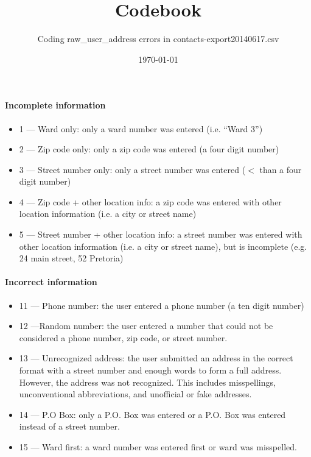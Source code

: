 \documentclass[12pt]{article}
\begin{document}

\linespread{1}

\title{Codebook}
\author{Coding raw\_user\_address errors in contacts-export20140617.csv}
\date{\today}

\maketitle

\paragraph{Incomplete information}
\begin{itemize}
\item 1 --- Ward only: only a ward number was entered (i.e. ``Ward 3'')
\item 2 --- Zip code only: only a zip code was entered (a four digit number)
\item 3 --- Street number only: only a street number was entered ($<$ than a four digit number)
\item 4 --- Zip code + other location info: a zip code was entered with other location information (i.e. a city or street name)
\item 5 --- Street number + other location info: a street number was entered with other location information (i.e. a city or street name), but is incomplete (e.g. 24 main street, 52 Pretoria)
\end{itemize}
\paragraph{Incorrect information}
\begin{itemize}
\item 11 --- Phone number: the user entered a phone number (a ten digit number)
\item 12 ---Random number: the user entered a number that could not be considered a phone number, zip code, or street number.
\item 13 --- Unrecognized address: the user submitted an address in the correct format with a street number and enough words to form a full address. However, the address was not recognized. This includes misspellings, unconventional abbreviations, and unofficial or fake addresses.
\item 14 --- P.O Box: only a P.O. Box was entered or a P.O. Box was entered instead of a street number. 
\item 15 --- Ward first: a ward number was entered first or ward was misspelled.
\end{itemize}
\end{document}
